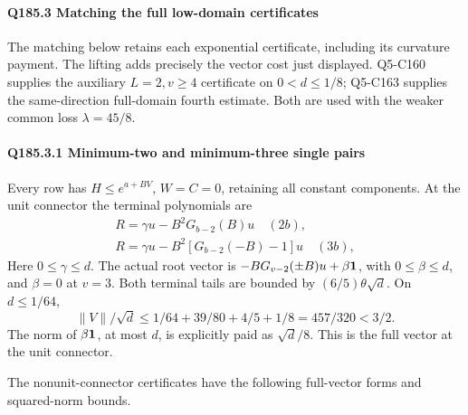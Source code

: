\paragraph{Q185.3 Matching the full low-domain certificates}

The matching below retains each exponential certificate, including its curvature payment. The lifting adds precisely the vector cost just displayed. Q5-C160 supplies the auxiliary \(L=2,\allowbreak \allowbreak  v\ge4\) certificate on \(0<d\le1/8\); Q5-C163 supplies the same-direction full-domain fourth estimate. Both are used with the weaker common loss \(\lambda=45/8\).

\paragraph{Q185.3.1 Minimum-two and minimum-three single pairs}

Every row has \(H\le e^{a+BV}\), \(W=C=0\), retaining all constant components. At the unit connector the terminal polynomials are
\[
\begin{gathered}
R=\gamma u-B^2G_{b-2}(B)u\quad(2b),\qquad\\
R=\gamma u-B^2[G_{b-2}(-B)-1]u\quad(3b),
\end{gathered}
\]
Here \(0\le\gamma\le d\). The actual root vector is \(-BG_{v-2}(\pm B)u+\beta\mathbf1\), with \(0\le\beta\le d\), and \(\beta=0\) at \(v=3\). Both terminal tails are bounded by \((6/5)\theta\sqrt d\). On \(d\le1/64\),
\[
 \|V\|/\sqrt d
 \le1/64+39/80+4/5+1/8=457/320<3/2.                \tag{Q185.14}
\]
The norm of \(\beta\mathbf1\), at most \(d\), is explicitly paid as \(\sqrt d/8\). This is the full vector at the unit connector.

The nonunit-connector certificates have the following full-vector forms and squared-norm bounds.


